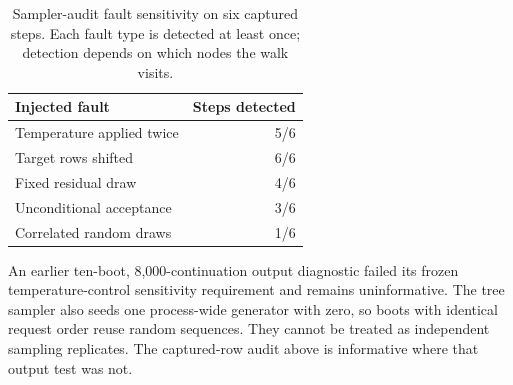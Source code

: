 \begin{table}[t]
\caption{Sampler-audit fault sensitivity on six captured steps. Each fault type is detected at least once; detection depends on which nodes the walk visits.}
\label{tab:sampling-faults}
\centering\small
\begin{tabular}{@{}lr@{}}
\toprule
Injected fault & Steps detected \\
\midrule
Temperature applied twice & 5/6 \\
Target rows shifted & 6/6 \\
Fixed residual draw & 4/6 \\
Unconditional acceptance & 3/6 \\
Correlated random draws & 1/6 \\
\bottomrule
\end{tabular}
\end{table}

An earlier ten-boot, 8,000-continuation output diagnostic failed its frozen temperature-control sensitivity requirement and remains uninformative. The tree sampler also seeds one process-wide generator with zero, so boots with identical request order reuse random sequences. They cannot be treated as independent sampling replicates. The captured-row audit above is informative where that output test was not.
